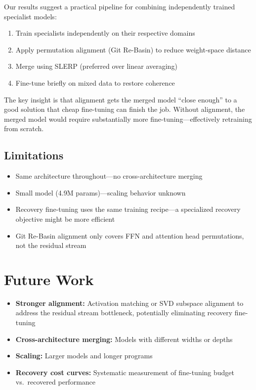 \documentclass[11pt,a4paper]{article}
\begin{document}
Our results suggest a practical pipeline for combining independently trained specialist models:

\begin{enumerate}
    \item Train specialists independently on their respective domains
    \item Apply permutation alignment (Git Re-Basin) to reduce weight-space distance
    \item Merge using SLERP (preferred over linear averaging)
    \item Fine-tune briefly on mixed data to restore coherence
\end{enumerate}

The key insight is that alignment gets the merged model ``close enough'' to a good solution that cheap fine-tuning can finish the job. Without alignment, the merged model would require substantially more fine-tuning---effectively retraining from scratch.

\subsection{Limitations}

\begin{itemize}
    \item Same architecture throughout---no cross-architecture merging
    \item Small model (4.9M params)---scaling behavior unknown
    \item Recovery fine-tuning uses the same training recipe---a specialized recovery objective might be more efficient
    \item Git Re-Basin alignment only covers FFN and attention head permutations, not the residual stream
\end{itemize}

\section{Future Work}

\begin{itemize}
    \item \textbf{Stronger alignment:} Activation matching or SVD subspace alignment to address the residual stream bottleneck, potentially eliminating recovery fine-tuning
    \item \textbf{Cross-architecture merging:} Models with different widths or depths
    \item \textbf{Scaling:} Larger models and longer programs
    \item \textbf{Recovery cost curves:} Systematic measurement of fine-tuning budget vs.\ recovered performance
\end{itemize}
\end{document}
